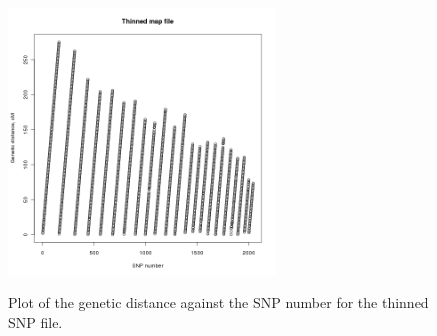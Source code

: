 \documentclass[a4paper,12pt]{article}
\begin{document}
{\begin{figure}[ht]
{\begin{center}
{\includegraphics[width=200pt]{thinnedMap.png}}
\caption{Plot of the genetic distance against the SNP number for the thinned SNP file.}
\label{thin-fig}
\end{center}}
\end{figure}
}
\end{document}
